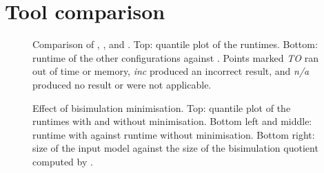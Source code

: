\documentclass[a4paper]{article}
\begin{document}
\section*{Tool comparison}

\begin{figure}[t]
    \centering

    \medskip

    \hfill
    \hfill

    \caption{Comparison of \cfgstorm, \cfgstormexact, \cfgmcsta{} and \cfgprism.
    Top: quantile plot of the runtimes. Bottom: runtime of the other
    configurations against \cfgstorm. Points marked \emph{TO} ran out of time or
    memory, \emph{inc} produced an incorrect result, and \emph{n/a} produced no
    result or were not applicable.}
    \label{fig:tools}
\end{figure}

\begin{figure}[t]
    \centering

    \medskip

    \hfill
    \hfill

    \caption{Effect of bisimulation minimisation. Top: quantile plot of the
    runtimes with and without minimisation. Bottom left and middle: runtime
    with against runtime without minimisation. Bottom right: size of the input
    model against the size of the bisimulation quotient computed by
    \cfgstormbisim.}
    \label{fig:bisim}
\end{figure}
\end{document}
